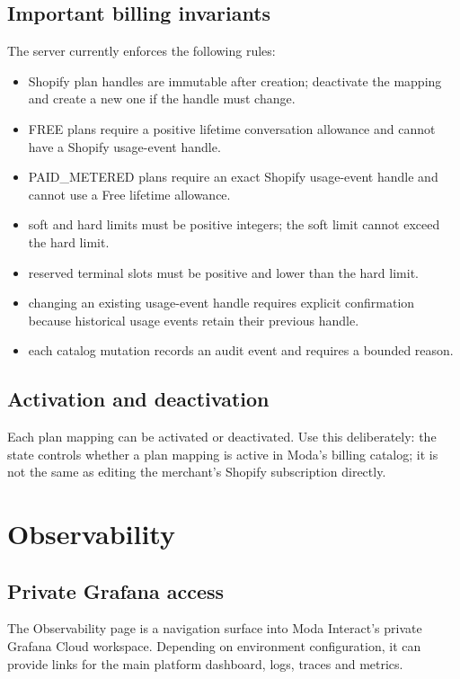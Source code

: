 \section{Important billing invariants}
The server currently enforces the following rules:
\begin{itemize}
  \item Shopify plan handles are immutable after creation; deactivate the mapping and create a new one if the handle must change.
  \item FREE plans require a positive lifetime conversation allowance and cannot have a Shopify usage-event handle.
  \item PAID\_METERED plans require an exact Shopify usage-event handle and cannot use a Free lifetime allowance.
  \item soft and hard limits must be positive integers; the soft limit cannot exceed the hard limit.
  \item reserved terminal slots must be positive and lower than the hard limit.
  \item changing an existing usage-event handle requires explicit confirmation because historical usage events retain their previous handle.
  \item each catalog mutation records an audit event and requires a bounded reason.
\end{itemize}

\section{Activation and deactivation}
Each plan mapping can be activated or deactivated. Use this deliberately: the state controls whether a plan mapping is active in Moda's billing catalog; it is not the same as editing the merchant's Shopify subscription directly.

\chapter{Observability}

\section{Private Grafana access}
The Observability page is a navigation surface into Moda Interact's private Grafana Cloud workspace. Depending on environment configuration, it can provide links for the main platform dashboard, logs, traces and metrics.


